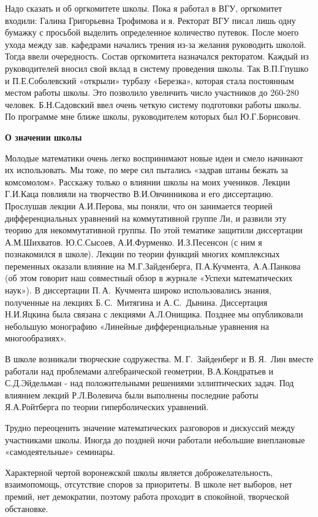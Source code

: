 Надо сказать и об оргкомитете школы. Пока я работал в ВГУ, оргкомитет входили: Галина Григорьевна Трофимова и я. Ректорат ВГУ писал лишь одну бумажку с просьбой выделить определенное количество путевок. После моего ухода между зав. кафедрами начались трения из-за желания руководить школой. Тогда ввели очередность. Состав оргкомитета назначался ректоратом. Каждый из руководителей вносил свой вклад в систему проведения школы. Так В.П.Гпушко и П.Е.Соболевский «открыли» турбазу «Березка», которая стала постоянным местом работы школы. Это позволило увеличить число участников до 260-280 человек. Б.Н.Садовский ввел очень четкую систему подготовки работы школы. По программе мне ближе школы, руководителем которых был Ю.Г.Борисович.

{\bf О значении школы}

Молодые математики очень легко воспринимают новые идеи и смело начинают их использовать.
Мы тоже, по мере сил пытались «задрав штаны бежать за комсомолом». Расскажу только о влиянии школы на моих учеников.
Лекции Г.И.Каца повлияли на творчество В.И.Овчинникова и его диссертацию.
Прослушав лекции А.И.Перова, мы поняли, что он занимается теорией дифференциальных уравнений на коммутативной группе Ли,
и развили эту теорию для некоммутативной группы.
По этой тематике защитили диссертации А.М.Шихватов. Ю.С.Сысоев, А.И.Фурменко. И.З.Песенсон (с ним я познакомился в школе).
Лекции по теории функций многих комплексных переменных оказали влияние на М.Г.Зайденберга, П.А.Кучмента, А.А.Панкова
(об этом говорит наш совместный обзор в журнале «Успехи математических наук»).
В диссертации П.\,А.~Кучмента широко использовались знания, полученные на лекциях Б.\,С.~Ми\-тя\-ги\-на и А.\,С.~Дынина. Диссертация Н.И.Яцкина была связана с лекциями А.Л.Онищика. Позднее мы опубликовали небольшую монографию «Линейные дифференциальные уравнения на многообразиях».

В школе возникали творческие содружества.
М.\,Г.~Зай\-ден\-берг и В.\,Я.~Лин вместе работали над проблемами алгебраической геометрии, В.А.Кондратьев и С.Д.Эйдельман - над положительными решениями эллиптических задач. Под влиянием лекций Р.Л.Волевича были выполнены последние работы Я.А.Ройтберга по теории гиперболических уравнений.

Трудно переоценить значение математических разговоров и дискуссий между участниками школы.
Иногда до поз\-д\-ней ночи работали небольшие внеплановые «самодеятельные» семинары.

Характерной чертой воронежской школы является доброжелательность, взаимопомощь, отсутствие споров за приоритеты. В школе нет выборов, нет премий, нет демократии, поэтому работа проходит в спокойной, творческой обстановке.

